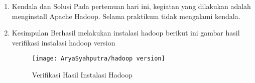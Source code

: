 
\begin{enumerate}
\item Kendala dan Solusi
Pada pertemuan hari ini, kegiatan yang dilakukan adalah menginstall Apache Hadoop. Selama praktikum tidak mengalami kendala.


\item Kesimpulan
Berhasil melakukan instalasi hadoop berikut ini gambar hasil verifikasi instalasi hadoop version 

\begin{figure}[!ht]
\texttt{[image: AryaSyahputra/hadoop version]}
\caption{Verifikasi Hasil Instalasi Hadoop}
\label{gam:Hadoop-version(Jihan)}
\end{figure}
\end{enumerate}

